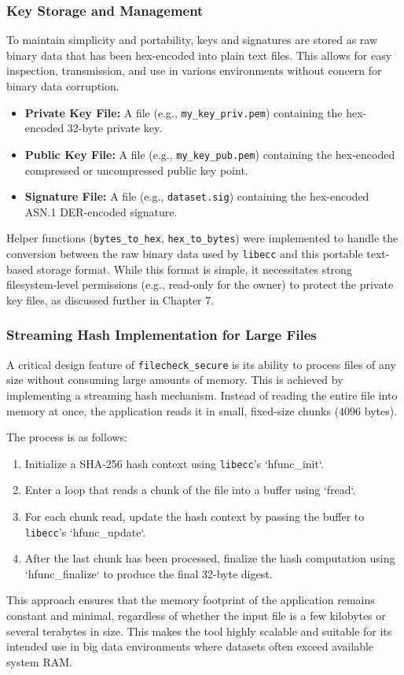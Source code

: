 \documentclass[12pt, letterpaper]{article}
\begin{document}
\subsubsection{Key Storage and Management}
To maintain simplicity and portability, keys and signatures are stored as raw binary data that has been hex-encoded into plain text files. This allows for easy inspection, transmission, and use in various environments without concern for binary data corruption.
\begin{itemize}
	\item \textbf{Private Key File:} A file (e.g., \texttt{my\_key\_priv.pem}) containing the hex-encoded 32-byte private key.
	\item \textbf{Public Key File:} A file (e.g., \texttt{my\_key\_pub.pem}) containing the hex-encoded compressed or uncompressed public key point.
	\item \textbf{Signature File:} A file (e.g., \texttt{dataset.sig}) containing the hex-encoded ASN.1 DER-encoded signature.
\end{itemize}
Helper functions (\texttt{bytes\_to\_hex}, \texttt{hex\_to\_bytes}) were implemented to handle the conversion between the raw binary data used by \texttt{libecc} and this portable text-based storage format. While this format is simple, it necessitates strong filesystem-level permissions (e.g., read-only for the owner) to protect the private key files, as discussed further in Chapter 7.

\subsubsection{Streaming Hash Implementation for Large Files}
A critical design feature of \texttt{filecheck\_secure} is its ability to process files of any size without consuming large amounts of memory. This is achieved by implementing a streaming hash mechanism. Instead of reading the entire file into memory at once, the application reads it in small, fixed-size chunks (4096 bytes).

The process is as follows:
\begin{enumerate}
	\item Initialize a SHA-256 hash context using \texttt{libecc}'s `hfunc\_init`.
	\item Enter a loop that reads a chunk of the file into a buffer using `fread`.
	\item For each chunk read, update the hash context by passing the buffer to \texttt{libecc}'s `hfunc\_update`.
	\item After the last chunk has been processed, finalize the hash computation using `hfunc\_finalize` to produce the final 32-byte digest.
\end{enumerate}
This approach ensures that the memory footprint of the application remains constant and minimal, regardless of whether the input file is a few kilobytes or several terabytes in size. This makes the tool highly scalable and suitable for its intended use in big data environments where datasets often exceed available system RAM.
	
\end{document}

